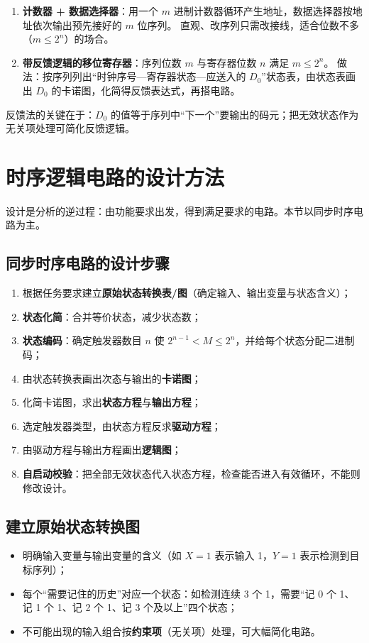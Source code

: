 \begin{enumerate}
    \item \textbf{计数器 + 数据选择器}：用一个 $m$ 进制计数器循环产生地址，数据选择器按地址依次输出预先接好的 $m$ 位序列。
    直观、改序列只需改接线，适合位数不多（$m\leq 2^n$）的场合。
    \item \textbf{带反馈逻辑的移位寄存器}：序列位数 $m$ 与寄存器位数 $n$ 满足 $m\leq 2^n$。
    做法：按序列列出“时钟序号—寄存器状态—应送入的 $D_0$”状态表，由状态表画出 $D_0$ 的卡诺图，化简得反馈表达式，再搭电路。
\end{enumerate}

\noindent 反馈法的关键在于：$D_0$ 的值等于序列中“下一个”要输出的码元；把无效状态作为无关项处理可简化反馈逻辑。

\section{时序逻辑电路的设计方法}
设计是分析的逆过程：由功能要求出发，得到满足要求的电路。本节以同步时序电路为主。

\subsection{同步时序电路的设计步骤}
\begin{enumerate}
    \item 根据任务要求建立\textbf{原始状态转换表/图}（确定输入、输出变量与状态含义）；
    \item \textbf{状态化简}：合并等价状态，减少状态数；
    \item \textbf{状态编码}：确定触发器数目 $n$ 使 $2^{n-1}<M\leq 2^n$，并给每个状态分配二进制码；
    \item 由状态转换表画出次态与输出的\textbf{卡诺图}；
    \item 化简卡诺图，求出\textbf{状态方程}与\textbf{输出方程}；
    \item 选定触发器类型，由状态方程反求\textbf{驱动方程}；
    \item 由驱动方程与输出方程画出\textbf{逻辑图}；
    \item \textbf{自启动校验}：把全部无效状态代入状态方程，检查能否进入有效循环，不能则修改设计。
\end{enumerate}

\subsection{建立原始状态转换图}
\begin{itemize}
    \item 明确输入变量与输出变量的含义（如 $X=1$ 表示输入 1，$Y=1$ 表示检测到目标序列）；
    \item 每个“需要记住的历史”对应一个状态：如检测连续 3 个 1，需要“记 0 个 1、记 1 个 1、记 2 个 1、记 3 个及以上”四个状态；
    \item 不可能出现的输入组合按\textbf{约束项}（无关项）处理，可大幅简化电路。
\end{itemize}

